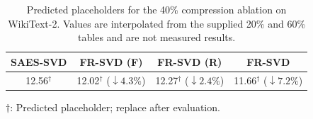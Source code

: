 \begin{table}[t]
\centering
\caption{Predicted placeholders for the 40\% compression ablation on WikiText-2. Values are interpolated from the supplied 20\% and 60\% tables and are not measured results.}
\label{tab:ablation-predicted-placeholder}
\begin{tabular}{cccc}
\toprule
SAES-SVD & FR-SVD (F) & FR-SVD (R) & FR-SVD \\
\midrule
12.56$^{\dagger}$ & 12.02$^{\dagger}$ (\textcolor{green!45!black}{$\downarrow 4.3\%$}) & 12.27$^{\dagger}$ (\textcolor{green!45!black}{$\downarrow 2.4\%$}) & 11.66$^{\dagger}$ (\textcolor{green!45!black}{$\downarrow 7.2\%$}) \\
\bottomrule
\end{tabular}
\par\smallskip\footnotesize $\dagger$: Predicted placeholder; replace after evaluation.
\end{table}

